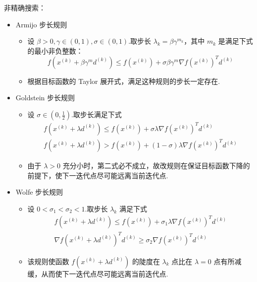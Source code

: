 \begin{remark}
    非精确搜索：
    \begin{itemize}
        \item Armijo 步长规则\begin{itemize}
            \item 设 $\beta > 0, \gamma \in (0, 1), \sigma \in (0, 1)$.取步长 $\lambda_k = \beta \gamma^{m_k}$，其中 $m_k$ 是满足下式的最小非负整数：\[f\left(x^{(k)}+\beta \gamma^{m} d^{(k)}\right) \leq f\left(x^{(k)}\right)+\sigma \beta \gamma^{m} \nabla f\left(x^{(k)}\right)^{T} d^{(k)}\]
            \item 根据目标函数的 Taylor 展开式，满足这种规则的步长一定存在.
        \end{itemize}
        \item Goldstein 步长规则\begin{itemize}
            \item 设 $\sigma \in (0, \frac{1}{2})$.取步长满足下式\begin{gather*}
                f\left(x^{(k)}+\lambda d^{(k)}\right) \leq f\left(x^{(k)}\right)+\sigma \lambda \nabla f\left(x^{(k)}\right)^{T} d^{(k)} \\
                f\left(x^{(k)}+\lambda d^{(k)}\right)>f\left(x^{(k)}\right)+(1-\sigma) \lambda \nabla f\left(x^{(k)}\right)^{T} d^{(k)}
            \end{gather*}
            \item 由于 $\lambda > 0$ 充分小时，第二式必不成立，故改规则在保证目标函数下降的前提下，使下一迭代点尽可能远离当前迭代点.
        \end{itemize}
        \item Wolfe 步长规则\begin{itemize}
            \item 设 $0 < \sigma_1 < \sigma_2 < 1$.取步长 $\lambda_k$ 满足下式\begin{gather*}
                f\left(x^{(k)}+\lambda d^{(k)}\right) \leq f\left(x^{(k)}\right)+\sigma_{1} \lambda \nabla f\left(x^{(k)}\right)^{T} d^{(k)} \\
                \nabla f\left(x^{(k)}+\lambda d^{(k)}\right)^{T} d^{(k)} \geq \sigma_{2} \nabla f\left(x^{(k)}\right)^{T} d^{(k)}
            \end{gather*}
            \item 该规则使函数 $f(x^{(k)} + \lambda d^{(k)})$ 的陡度在 $\lambda_k$ 点比在 $\lambda = 0$ 点有所减缓，从而使下一迭代点尽可能远离当前迭代点.
        \end{itemize}
    \end{itemize}
\end{remark}

